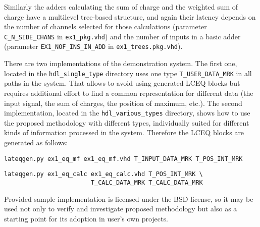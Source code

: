 \documentclass[preprint,11pt]{elsarticle}
\begin{document}
Similarly the adders calculating the sum of charge and the weighted sum of charge have a multilevel tree-based structure, and again their latency depends on the number of channels selected for those calculations (parameter \verb|C_N_SIDE_CHANS| in \verb|ex1_pkg.vhd|) and the number of inputs in a basic adder 
(parameter \verb|EX1_NOF_INS_IN_ADD| in \verb|ex1_trees.pkg.vhd|).

There are two implementations of the demonstration system. The first one, located in
the \verb|hdl_single_type| directory uses one type \verb|T_USER_DATA_MRK| in all paths
in the system. That allows to avoid using generated LCEQ blocks but requires
additional effort to find a common representation for different data (the input signal,
the sum of charges, the position of maximum, etc.).
The second implementation, located in the \verb|hdl_various_types| directory,
shows how to use the proposed methodology with different types, individually 
suited for different kinds of information processed in the system. Therefore
the LCEQ blocks are generated as follows:

\verb|lateqgen.py ex1_eq_mf ex1_eq_mf.vhd T_INPUT_DATA_MRK T_POS_INT_MRK|

\verb|lateqgen.py ex1_eq_calc ex1_eq_calc.vhd T_POS_INT_MRK \|\\
\verb|                        T_CALC_DATA_MRK T_CALC_DATA_MRK|

Provided sample implementation is licensed under the BSD license, so it may be used
not only to verify and investigate proposed methodology but also as a starting point for its adoption in user's own projects.
\end{document}
